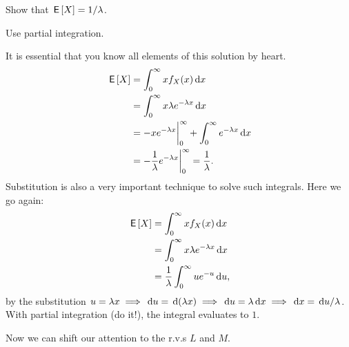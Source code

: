 \documentclass[a4paper,12pt]{article}
\begin{document}
\begin{exercise}\label{ex:4}
Show that $\,\mathsf{E}\left[X\right] = 1/\lambda$.
\begin{hint}
  Use partial integration.
\end{hint}
\begin{solution}
It is essential that  you know all elements of this solution  by heart.
  \begin{align}
\,\mathsf{E}\left[X\right] 
&= \int_{0}^{\infty}  x f_{X}(x) \,\textrm{d}x  \\
&= \int_{0}^{\infty}  x \lambda e^{-\lambda x} \,\textrm{d}x  \\
&= - xe^{-\lambda x} \biggr|_{0}^{\infty} + \int_{0}^{\infty}  e^{-\lambda x} \,\textrm{d}x  \\
&=  - \frac 1 \lambda e^{-\lambda x} \biggr|_{0}^{\infty} = \frac 1 \lambda.
  \end{align}
Substitution is also a very important technique to solve such integrals. Here we go again:
  \begin{align}
\,\mathsf{E}\left[X\right] 
&= \int_{0}^{\infty}  x f_{X}(x) \,\textrm{d}x  \\
&= \int_{0}^{\infty}  x \lambda e^{-\lambda x} \,\textrm{d}x  \\
&= \frac 1 \lambda \int_{0}^{\infty}  u  e^{- u} \,\textrm{d}u, 
  \end{align}
  by the substitution $u=\lambda x \implies \,\textrm{d}u = \,\textrm{d}(\lambda x) \implies \,\textrm{d}u = \lambda \,\textrm{d}x \implies \,\textrm{d}x = \,\textrm{d}u / \lambda$.
  With partial integration (do it!), the integral evaluates to $1$.
\end{solution}
\end{exercise}


Now we can shift our attention to the r.v.s $L$ and $M$.
\end{document}

